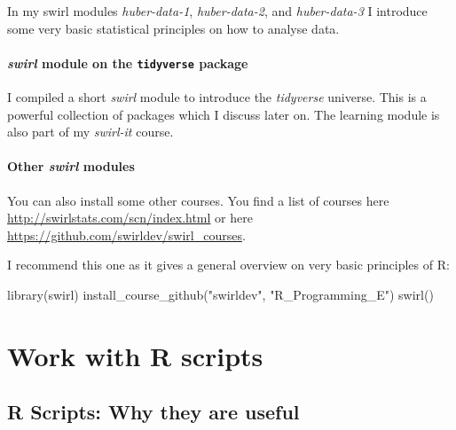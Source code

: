 \documentclass[
  12pt,
  oneside]{book}
\newenvironment{Shaded}{\begin{snugshade}}{\end{snugshade}}
\newcommand{\FunctionTok}[1]{\textcolor[rgb]{0.00,0.00,0.00}{#1}}
\newcommand{\NormalTok}[1]{#1}
\newcommand{\StringTok}[1]{\textcolor[rgb]{0.31,0.60,0.02}{#1}}
\theoremstyle{definition}
\theoremstyle{definition}
\theoremstyle{definition}
\theoremstyle{definition}
\theoremstyle{remark}
\begin{document}
In my swirl modules \emph{huber-data-1}, \emph{huber-data-2}, and \emph{huber-data-3} I introduce some very basic statistical principles on how to analyse data.

\hypertarget{swirl-module-on-the-tidyverse-package}{%
\subsubsection*{\texorpdfstring{\emph{swirl} module on the \texttt{tidyverse} package}{swirl module on the tidyverse package}}\label{swirl-module-on-the-tidyverse-package}}

I compiled a short \emph{swirl} module to introduce the \emph{tidyverse} universe. This is a powerful collection of packages which I discuss later on. The learning module is also part of my \emph{swirl-it} course.

\hypertarget{other-swirl-modules}{%
\subsubsection*{\texorpdfstring{Other \emph{swirl} modules}{Other swirl modules}}\label{other-swirl-modules}}

You can also install some other courses. You find a list of courses here \url{http://swirlstats.com/scn/index.html} or here \url{https://github.com/swirldev/swirl_courses}.

I recommend this one as it gives a general overview on very basic principles of R:

\begin{Shaded}
\begin{Highlighting}[]
\FunctionTok{library}\NormalTok{(swirl)}
\FunctionTok{install\_course\_github}\NormalTok{(}\StringTok{"swirldev"}\NormalTok{, }\StringTok{"R\_Programming\_E"}\NormalTok{)}
\FunctionTok{swirl}\NormalTok{()}
\end{Highlighting}
\end{Shaded}

\hypertarget{work-with-r-scripts}{%
\chapter{Work with R scripts}\label{work-with-r-scripts}}

\hypertarget{r-scripts-why-they-are-useful}{%
\section{R Scripts: Why they are useful}\label{r-scripts-why-they-are-useful}}
\end{document}
